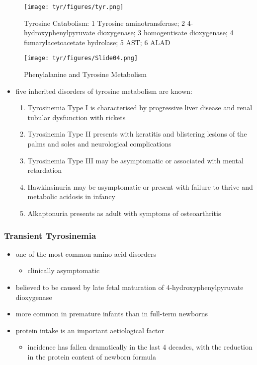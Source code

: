 \documentclass[12pt]{scrartcl}
\begin{document}
\begin{figure}[htbp]
\centering
\texttt{[image: tyr/figures/tyr.png]}
\caption{\label{fig:org4a8cdb2}Tyrosine Catabolism: 1 Tyrosine aminotransferase; 2 4-hydroxyphenylpyruvate dioxygenase; 3 homogentisate dioxygenase; 4 fumarylacetoacetate hydrolase; 5 AST; 6 ALAD}
\end{figure}


\begin{figure}[htbp]
\centering
\texttt{[image: tyr/figures/Slide04.png]}
\caption{\label{fig:orgd7fe2c4}Phenylalanine and Tyrosine Metabolism}
\end{figure}

\begin{itemize}
\item five inherited disorders of tyrosine metabolism are known:
\begin{enumerate}
\item Tyrosinemia Type I is characterised by progressive
liver disease and renal tubular dysfunction with rickets
\item Tyrosinemia Type II presents with keratitis and
blistering lesions of the palms and soles and neurological
complications
\item Tyrosinemia Type III may be asymptomatic or associated with
mental retardation
\item Hawkinsinuria may be asymptomatic or present with failure to
thrive and metabolic acidosis in infancy
\item Alkaptonuria presents as adult with symptoms of osteoarthritis
\end{enumerate}
\end{itemize}

\subsubsection{Transient Tyrosinemia}
\label{sec:org064c59e}
\begin{itemize}
\item one of the most common amino acid disorders
\begin{itemize}
\item clinically asymptomatic
\end{itemize}
\item believed to be caused by late fetal maturation of
4-hydroxyphenylpyruvate dioxygenase
\item more common in premature infants than in full-term newborns
\item protein intake is an important aetiological factor
\begin{itemize}
\item incidence has fallen dramatically in the last 4 decades, with the
reduction in the protein content of newborn formula
\end{itemize}
\end{itemize}
\end{document}
